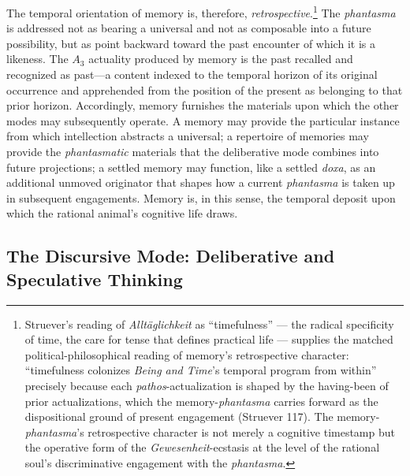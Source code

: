 \documentclass{article}
\begin{document}
The temporal orientation of memory is, therefore, \textit{retrospective}.\footnote{Struever's reading of \textit{Alltäglichkeit} as ``timefulness'' --- the radical specificity of time, the care for tense that defines practical life --- supplies the matched political-philosophical reading of memory's retrospective character: ``timefulness colonizes \textit{Being and Time}'s temporal program from within'' precisely because each \textit{pathos}-actualization is shaped by the having-been of prior actualizations, which the memory-\textit{phantasma} carries forward as the dispositional ground of present engagement (Struever 117). The memory-\textit{phantasma}'s retrospective character is not merely a cognitive timestamp but the operative form of the \textit{Gewesenheit}-ecstasis at the level of the rational soul's discriminative engagement with the \textit{phantasma}.} The \textit{phantasma} is addressed not as bearing a universal and not as composable into a future possibility, but as point backward toward the past encounter of which it is a likeness. The $A_3$ actuality produced by memory is the past recalled and recognized as past---a content indexed to the temporal horizon of its original occurrence and apprehended from the position of the present as belonging to that prior horizon. Accordingly, memory furnishes the materials upon which the other modes may subsequently operate. A memory may provide the particular instance from which intellection abstracts a universal; a repertoire of memories may provide the \textit{phantasmatic} materials that the deliberative mode combines into future projections; a settled memory may function, like a settled \textit{doxa}, as an additional unmoved originator that shapes how a current \textit{phantasma} is taken up in subsequent engagements. Memory is, in this sense, the temporal deposit upon which the rational animal's cognitive life draws. 

\subsection{The Discursive Mode: Deliberative and Speculative Thinking}
\end{document}
